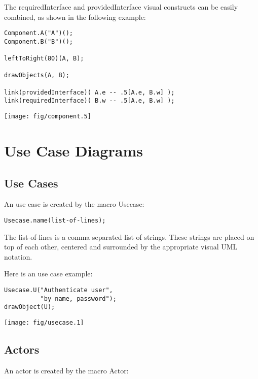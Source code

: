 \documentclass{article}
\newcommand{\code}{\ttfamily}
\begin{document}
\vspace{0.5cm}

The {\code requiredInterface} and {\code providedInterface} visual constructs can be easily combined, as shown in the following example:

\begin{multicols}{2}
\begin{verbatim}
Component.A("A")();
Component.B("B")();

leftToRight(80)(A, B);

drawObjects(A, B);

link(providedInterface)( A.e -- .5[A.e, B.w] );
link(requiredInterface)( B.w -- .5[A.e, B.w] );
\end{verbatim}
\columnbreak
\hspace{-1cm}\texttt{[image: fig/component.5]}
\end{multicols}


\section{Use Case Diagrams}

\subsection{Use Cases}
An use case is created by the macro {\code Usecase}:

\begin{verbatim}
Usecase.name(list-of-lines);
\end{verbatim}

The {\code list-of-lines} is a comma separated list of strings. These strings are placed
on top of each other, centered and surrounded by the appropriate visual UML notation.

Here is an use case example:

\begin{multicols}{2}
\begin{verbatim}
Usecase.U("Authenticate user",
          "by name, password");
drawObject(U);
\end{verbatim}
\columnbreak
\hspace{1cm}\texttt{[image: fig/usecase.1]}
\end{multicols}

\subsection{Actors}

An actor is created by the macro {\code Actor}:
\end{document}
